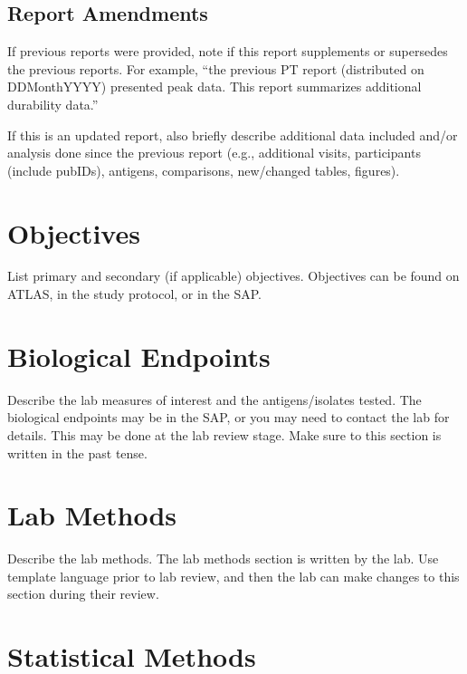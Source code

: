 \documentclass[11pt]{article}
\begin{document}
\hypertarget{report-amendments}{%
\subsection{Report Amendments}\label{report-amendments}}

If previous reports were provided, note if this report supplements or supersedes
the previous reports.
For example, ``the previous PT report (distributed on DDMonthYYYY) presented
peak data. This report summarizes additional durability data.''

If this is an updated report, also briefly describe additional data included
and/or analysis done since the previous report (e.g., additional visits,
participants (include pubIDs), antigens, comparisons, new/changed tables, figures).

\hypertarget{objectives}{%
\section{Objectives}\label{objectives}}

List primary and secondary (if applicable) objectives.
Objectives can be found on ATLAS, in the study protocol, or in the SAP.

\hypertarget{biological-endpoints}{%
\section{Biological Endpoints}\label{biological-endpoints}}

Describe the lab measures of interest and the antigens/isolates tested.
The biological endpoints may be in the SAP, or you may need to contact the lab
for details. This may be done at the lab review stage.
Make sure to this section is written in the past tense.

\hypertarget{lab-methods}{%
\section{Lab Methods}\label{lab-methods}}

Describe the lab methods.
The lab methods section is written by the lab.
Use template language prior to lab review, and then the lab can make changes to
this section during their review.

\hypertarget{statistical-methods}{%
\section{Statistical Methods}\label{statistical-methods}}
\end{document}
